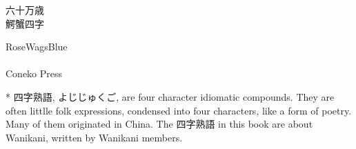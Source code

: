\documentclass[letterpaper]{article}
\begin{document}
\fontsize{24}{24}
\vfill

\begin{center}
\begin{multicols}{2}
\RLmulticolcolumns
六十万歳\\
鰐蟹四字\\
\end{multicols}
\vfill
\hspace{0pt}

RoseWagsBlue\\
\the\year\ \\
Coneko Press
\end{center}

\newpage
*
\newpage
\fontsize{9}{9}
\noindent
四字熟語, よじじゅくご, are four character idiomatic compounds.  They are often littlle folk expressions, condensed into four characters, like a form of poetry.  Many of them originated in China.  The 四字熟語 in this book are about Wanikani, written by Wanikani members.  
\newpage
\end{document}
